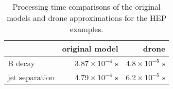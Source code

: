 \begin{table}[t]
  \centering
  \caption{Processing time comparisons of the original models and drone
  approximations for the HEP examples. \label{tab:comp}}
  \begin{tabular}{l|rr}
                   & original model                  & drone \\
    \hline
    B decay        & $3.87 \times 10^{-4}$ s & $4.8 \times 10^{-5}$ s \\
    jet separation & $4.79 \times 10^{-4}$ s & $6.2 \times 10^{-5}$ s \\
  \end{tabular}
\end{table}
